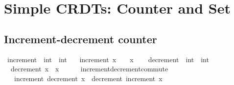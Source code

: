 \section{Simple CRDTs: Counter and Set}
\label{sect.simple.crdts}

\subsection{Increment-decrement counter}
\label{subsect.increment-decrement.counter}

\begin{isabellebody}
\isanewline
{}\isamarkupfalse%
\ increment\ {\isacharcolon}{\isacharcolon}\ {\isachardoublequoteopen}int\ {\isasymRightarrow}\ int{\isachardoublequoteclose}\ \isanewline
\ \ {\isachardoublequoteopen}increment\ x\ {\isasymequiv}\ {}\ {\isacharplus}\ x{\isachardoublequoteclose}\isanewline
\ \ \isanewline
{}\isamarkupfalse%
\ decrement\ {\isacharcolon}{\isacharcolon}\ {\isachardoublequoteopen}int\ {\isasymRightarrow}\ int{\isachardoublequoteclose}\ \isanewline
\ \ {\isachardoublequoteopen}decrement\ x\ {\isasymequiv}\ x\ {\isacharminus}\ {}{\isachardoublequoteclose}\isanewline
\ \ \isanewline
{}\isamarkupfalse%
\ increment{\isacharunderscore}decrement{\isacharunderscore}commute{\isacharcolon}\isanewline
\ \ \ {\isachardoublequoteopen}increment\ {\isacharparenleft}decrement\ x{\isacharparenright}\ {\isacharequal}\ decrement\ {\isacharparenleft}increment\ x{\isacharparenright}{\isachardoublequoteclose}\isanewline
\end{isabellebody}

